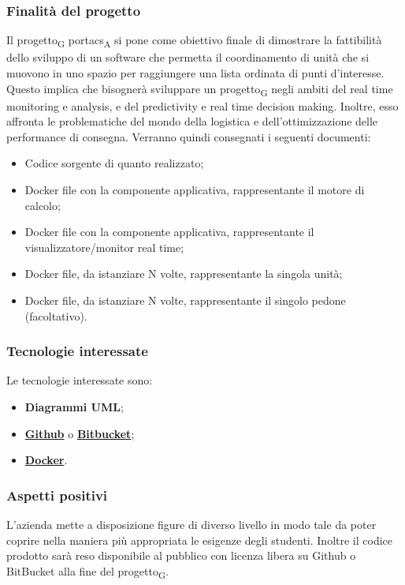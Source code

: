 \subsubsection{Finalità del progetto}
Il \gls{progetto}\textsubscript{G} \acrshort{portacs}\textsubscript{A} si pone come obiettivo finale di dimostrare la fattibilità dello sviluppo di un software che permetta il coordinamento di unità che si muovono in uno spazio per raggiungere una lista ordinata di punti d'interesse. Questo implica che bisognerà sviluppare un \gls{progetto}\textsubscript{G} negli ambiti del real time monitoring e analysis, e del predictivity e real time decision making. Inoltre, esso affronta le problematiche del mondo della logistica e dell'ottimizzazione delle performance di consegna.
Verranno quindi consegnati i seguenti documenti:
\begin{itemize}
	\item Codice sorgente di quanto realizzato;
	\item Docker file con la componente applicativa, rappresentante il motore di calcolo;
	\item Docker file con la componente applicativa, rappresentante il visualizzatore/monitor real time;
	\item Docker file, da istanziare N volte, rappresentante la singola unità;
	\item Docker file, da istanziare N volte, rappresentante il singolo pedone (facoltativo).
\end{itemize}
\subsubsection{Tecnologie interessate}
Le tecnologie interessate sono:
\begin{itemize}
	\item \textbf{Diagrammi UML};
	\item \textbf{\href{https://github.com/about}{Github}} o \textbf{\href{https://bitbucket.org/product/guides/getting-started/overview}{Bitbucket}};	
	\item \textbf{\href{https://www.docker.com/why-docker}{Docker}}.
\end{itemize}
\subsubsection{Aspetti positivi}
L'azienda mette a disposizione figure di diverso livello in modo tale da poter coprire nella maniera più appropriata le esigenze degli studenti.
Inoltre il codice prodotto sarà reso disponibile al pubblico con licenza libera su Github o BitBucket alla fine del \gls{progetto}\textsubscript{G}.
